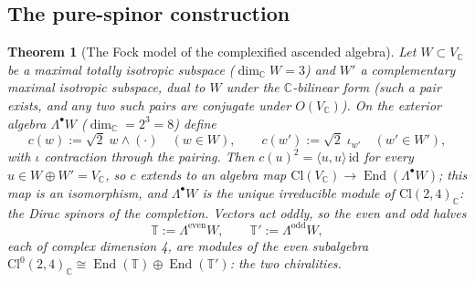 \documentclass[11pt]{article}
\newtheorem{theorem}{Theorem}[section]
\theoremstyle{definition}
\newcommand{\Cl}{\mathrm{Cl}}
\newcommand{\C}{\mathbb{C}}
\newcommand{\T}{\mathbb{T}}
\newcommand{\End}{\operatorname{End}}
\newcommand{\id}{\mathrm{id}}
\newcommand{\ip}[2]{\langle #1, #2\rangle}
\begin{document}
\subsection{The pure-spinor construction}\label{subsec:purespinor}

\begin{theorem}[The Fock model of the complexified ascended algebra]\label{thm:purespinor}
Let $W \subset V_\C$ be a maximal totally isotropic subspace ($\dim_\C W = 3$) and $W'$ a complementary maximal isotropic subspace, dual to $W$ under the $\C$-bilinear form (such a pair exists, and any two such pairs are conjugate under $O(V_\C)$). On the exterior algebra $\Lambda^\bullet W$ ($\dim_\C = 2^3 = 8$) define
\[
c(w) := \sqrt2\; w \wedge (\cdot) \quad (w \in W),
\qquad
c(w') := \sqrt2\; \iota_{w'} \quad (w' \in W'),
\]
with $\iota$ contraction through the pairing. Then $c(u)^2 = \ip{u}{u}\,\id$ for every $u \in W \oplus W' = V_\C$, so $c$ extends to an algebra map $\Cl(V_\C) \to \End(\Lambda^\bullet W)$; this map is an isomorphism, and $\Lambda^\bullet W$ is the unique irreducible module of $\Cl(2,4)_\C$: the Dirac spinors of the completion. Vectors act oddly, so the even and odd halves
\[
\T := \Lambda^{\mathrm{even}} W, \qquad \T' := \Lambda^{\mathrm{odd}} W,
\]
each of complex dimension 4, are modules of the even subalgebra $\Cl^0(2,4)_\C \cong \End(\T) \oplus \End(\T')$: the two chiralities.
\end{theorem}
\end{document}
